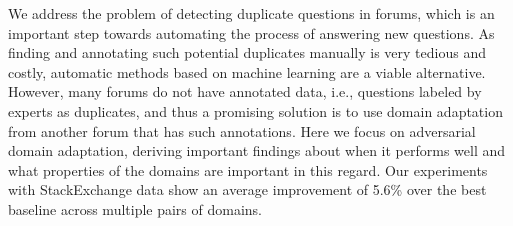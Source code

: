 We address the problem of detecting duplicate questions in forums, which is an important step towards automating the process of answering new questions. As finding and annotating such potential duplicates manually is very tedious and costly, automatic methods based on machine learning are a viable alternative. However, many forums do not have annotated data, i.e., questions labeled by experts as duplicates, and thus a promising solution is to use domain adaptation from another forum that has such annotations. Here we focus on adversarial domain adaptation, deriving important findings about when it performs well and what properties of the domains are important in this regard. Our experiments with StackExchange data show an average improvement of 5.6\% over the best baseline across multiple pairs of domains.
